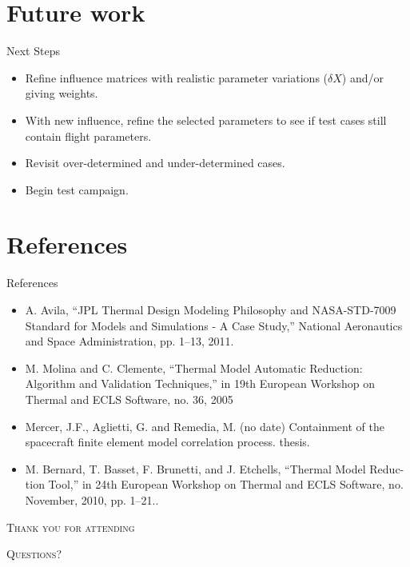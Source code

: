 \documentclass{cubeamer}
\begin{document}

\section{Future work}

\begin{frame}{Next Steps}
    \begin{itemize}
        \item Refine influence matrices with realistic parameter variations ($\delta X$) and/or giving weights.
        \item With new influence, refine the selected parameters to see if test cases still contain flight parameters.
        \item Revisit over-determined and under-determined cases.
        \item Begin test campaign.
    \end{itemize}
\end{frame}

\section{References}
\begin{frame}{References}
\begin{itemize}
\small
    \item A. Avila, “JPL Thermal Design Modeling Philosophy and NASA-STD-7009
Standard for Models and Simulations - A Case Study,” National Aeronautics
and Space Administration, pp. 1–13, 2011.
    \item M. Molina and C. Clemente, “Thermal Model Automatic Reduction: Algorithm
and Validation Techniques,” in 19th European Workshop on Thermal and ECLS
Software, no. 36, 2005
    \item Mercer, J.F., Aglietti, G. and Remedia, M. (no date) Containment of the spacecraft finite element model correlation process. thesis. 
    \item M. Bernard, T. Basset, F. Brunetti, and J. Etchells, “Thermal Model Reduc-
tion Tool,” in 24th European Workshop on Thermal and ECLS Software, no.
November, 2010, pp. 1–21..
\end{itemize}
\end{frame}

 

\begin{frame}[standout]
    \Huge\textsc{Thank you for attending}
    
    \vfill
    
    \LARGE\textsc{Questions?}
\end{frame}
\end{document}
